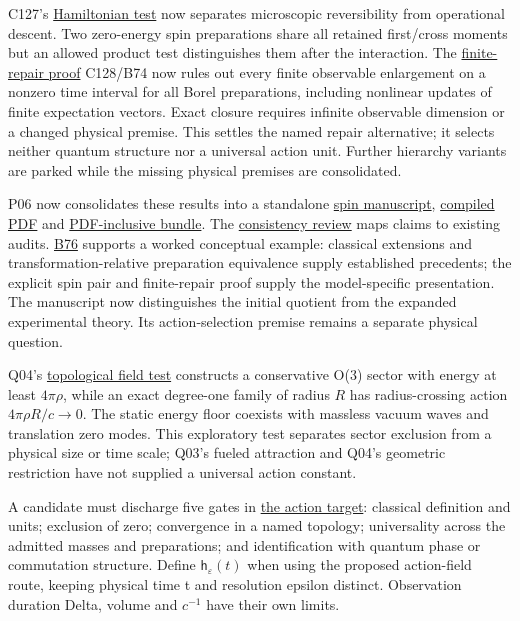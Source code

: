\documentclass[11pt,a4paper]{article}
\begin{document}
C127's \href{../notes/classical-orientation-closure.md#a-complete-classical-interaction-fails-moment-descent}{Hamiltonian test}
now separates microscopic reversibility from operational descent. Two
zero-energy spin preparations share all retained first/cross moments but
an allowed product test distinguishes them after the interaction. The
\href{../notes/classical-orientation-closure.md#no-finite-observable-enlargement-repairs-this-interaction}{finite-repair proof}
C128/B74 now rules out every finite observable enlargement on a nonzero
time interval for all Borel preparations, including nonlinear updates of
finite expectation vectors. Exact closure requires infinite observable
dimension or a changed physical premise. This settles the named repair
alternative; it selects neither quantum structure nor a universal action
unit. Further hierarchy variants are parked while the missing physical
premises are consolidated.

P06 now consolidates these results into a standalone
\href{../papers/classical-spins-operational-closure.tex}{spin
manuscript},
\href{../out/papers/classical-spins-operational-closure.pdf}{compiled
PDF} and
\href{../out/publications/classical-spins-operational-closure.zip}{PDF-inclusive
bundle}. The \href{../reviews/spin-publication-P06.md}{consistency
review} maps claims to existing audits.
\href{../reviews/spin-publication-B76.md}{B76} supports a worked
conceptual example: classical extensions and transformation-relative
preparation equivalence supply established precedents; the explicit spin
pair and finite-repair proof supply the model-specific presentation. The
manuscript now distinguishes the initial quotient from the expanded
experimental theory. Its action-selection premise remains a separate
physical question.

Q04's \href{../notes/topological-sector-action-selection.md}{topological
field test} constructs a conservative O(3) sector with energy at least
\(4\pi\rho\), while an exact degree-one family of radius \(R\) has
radius-crossing action \(4\pi\rho R/c\to0\). The static energy floor
coexists with massless vacuum waves and translation zero modes. This
exploratory test separates sector exclusion from a physical size or time
scale; Q03's fueled attraction and Q04's geometric restriction have not
supplied a universal action constant.

A candidate must discharge five gates in
\href{ACTION_FIELD_TARGET.md}{the action target}: classical definition
and units; exclusion of zero; convergence in a named topology;
universality across the admitted masses and preparations; and
identification with quantum phase or commutation structure. Define
\(\mathsf h_\varepsilon(t)\) when using the proposed action-field route,
keeping physical time t and resolution epsilon distinct. Observation
duration Delta, volume and \(c^{-1}\) have their own limits.
\end{document}
